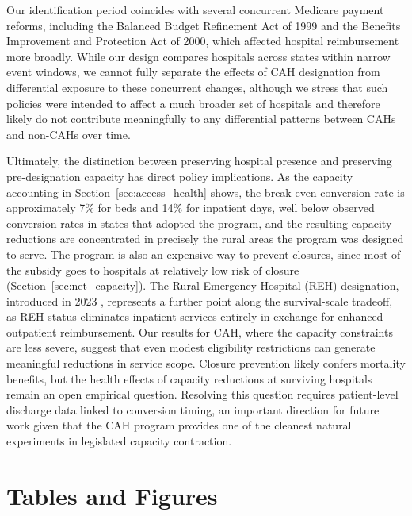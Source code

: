 \documentclass[a4paper, 12pt, twoside]{article}
\begin{document}
Our identification period coincides with several concurrent Medicare payment reforms, including the Balanced Budget Refinement Act of 1999 and the Benefits Improvement and Protection Act of 2000, which affected hospital reimbursement more broadly. While our design compares hospitals across states within narrow event windows, we cannot fully separate the effects of CAH designation from differential exposure to these concurrent changes, although we stress that such policies were intended to affect a much broader set of hospitals and therefore likely do not contribute meaningfully to any differential patterns between CAHs and non-CAHs over time.

Ultimately, the distinction between preserving hospital presence and preserving pre-designation capacity has direct policy implications. As the capacity accounting in Section~\ref{sec:access_health} shows, the break-even conversion rate is approximately 7\% for beds and 14\% for inpatient days, well below observed conversion rates in states that adopted the program, and the resulting capacity reductions are concentrated in precisely the rural areas the program was designed to serve. The program is also an expensive way to prevent closures, since most of the subsidy goes to hospitals at relatively low risk of closure (Section~\ref{sec:net_capacity}). The Rural Emergency Hospital (REH) designation, introduced in 2023 \citep{cms2022}, represents a further point along the survival-scale tradeoff, as REH status eliminates inpatient services entirely in exchange for enhanced outpatient reimbursement. Our results for CAH, where the capacity constraints are less severe, suggest that even modest eligibility restrictions can generate meaningful reductions in service scope. Closure prevention likely confers mortality benefits, but the health effects of capacity reductions at surviving hospitals remain an open empirical question. Resolving this question requires patient-level discharge data linked to conversion timing, an important direction for future work given that the CAH program provides one of the cleanest natural experiments in legislated capacity contraction.

\pagebreak


\clearpage
\newpage


\section*{Tables and Figures}
\end{document}
